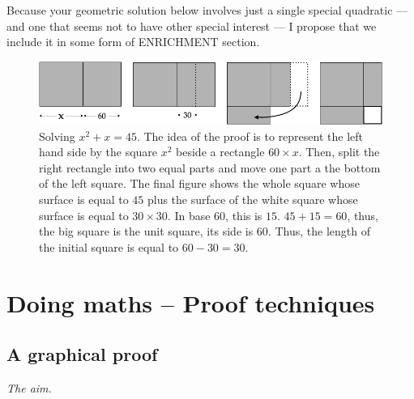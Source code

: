 {\Arny Because your geometric solution below involves just a single
  special quadratic --- and one that seems not to have other special
  interest --- I propose that we include it in some form of ENRICHMENT
  section.  }

{}

\begin{figure}[htb]
\begin{center}
       \includegraphics[scale=0.4]{FiguresArithmetic/tabletteMesopotamie}
\caption{Solving $x^2 + x = 45$.
The idea of the proof is to represent the left hand side by the square $x^2$ beside a rectangle $60 \times x$.
Then, split the right rectangle into two equal parts and move one part a the bottom of the left square.
The final figure shows the whole square whose surface is equal to $45$ plus the surface of the white square
whose surface is equal to $30 \times 30$.
In base $60$, this is $15$. 
$45+15 = 60$, thus, the big square is the unit square, its side is $60$.
Thus, the length of the initial square is equal to $60-30=30$.}
\label{fig:equationBabillon}
\end{center}
\end{figure}





\section{Doing maths -- Proof techniques}

\subsection{A graphical proof}

\noindent \textit{The aim.}

